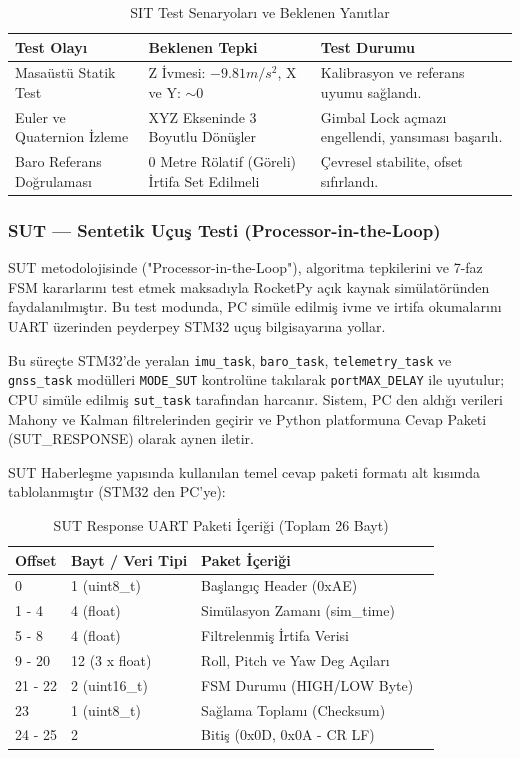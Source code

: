 \begin{table}[H]
    \centering
    \caption{SIT Test Senaryoları ve Beklenen Yanıtlar}
    \label{tab:sit_senaryolar}
    \begin{tabular}{|p{4cm}|p{6cm}|p{5cm}|}
    \hline
    \textbf{Test Olayı} & \textbf{Beklenen Tepki} & \textbf{Test Durumu} \\ \hline
    Masaüstü Statik Test & Z İvmesi: $-9.81 m/s^2$, X ve Y: $\sim 0$ & Kalibrasyon ve referans uyumu sağlandı. \\ \hline
    Euler ve Quaternion İzleme & XYZ Ekseninde 3 Boyutlu Dönüşler & Gimbal Lock açmazı engellendi, yansıması başarılı. \\ \hline
    Baro Referans Doğrulaması & 0 Metre Rölatif (Göreli) İrtifa Set Edilmeli & Çevresel stabilite, ofset sıfırlandı. \\ \hline
    \end{tabular}
\end{table}

\subsubsection{SUT — Sentetik Uçuş Testi (Processor-in-the-Loop)}
SUT metodolojisinde ("Processor-in-the-Loop"), algoritma tepkilerini ve 7-faz FSM kararlarını test etmek maksadıyla RocketPy \cite{rocketpy} açık kaynak simülatöründen faydalanılmıştır. Bu test modunda, PC simüle edilmiş ivme ve irtifa okumalarını UART üzerinden peyderpey STM32 uçuş bilgisayarına yollar. 

Bu süreçte STM32'de yeralan \verb|imu_task|, \verb|baro_task|, \verb|telemetry_task| ve \verb|gnss_task| modülleri \verb|MODE_SUT| kontrolüne takılarak \verb|portMAX_DELAY| ile uyutulur; CPU simüle edilmiş \verb|sut_task| tarafından harcanır. Sistem, PC den aldığı verileri Mahony ve Kalman filtrelerinden geçirir ve Python platformuna Cevap Paketi (SUT\_RESPONSE) olarak aynen iletir.

SUT Haberleşme yapısında kullanılan temel cevap paketi formatı alt kısımda tablolanmıştır (STM32 den PC'ye):
\begin{table}[H]
    \centering
    \caption{SUT Response UART Paketi İçeriği (Toplam 26 Bayt)}
    \label{tab:sut_response}
    \begin{tabular}{|l|l|l|l|}
    \hline
    \textbf{Offset} & \textbf{Bayt / Veri Tipi} & \textbf{Paket İçeriği} \\ \hline
    0 & 1 (uint8\_t) & Başlangıç Header (0xAE) \\ \hline
    1 - 4 & 4 (float) & Simülasyon Zamanı (sim\_time) \\ \hline
    5 - 8 & 4 (float) & Filtrelenmiş İrtifa Verisi \\ \hline
    9 - 20 & 12 (3 x float) & Roll, Pitch ve Yaw Deg Açıları \\ \hline
    21 - 22 & 2 (uint16\_t) & FSM Durumu (HIGH/LOW Byte) \\ \hline
    23 & 1 (uint8\_t) & Sağlama Toplamı (Checksum) \\ \hline
    24 - 25 & 2 & Bitiş (0x0D, 0x0A - CR LF) \\ \hline
    \end{tabular}
\end{table}

